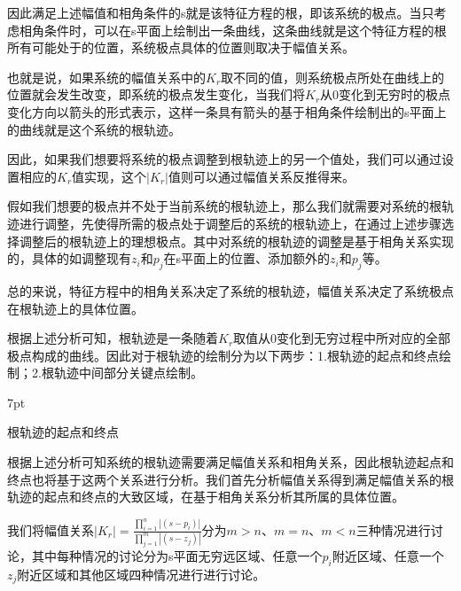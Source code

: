 \documentclass{article}
\numberwithin{equation}{section}
\numberwithin{figure}{section}
\newenvironment{formal}{%
\def\FrameCommand{%
\hspace{1pt}%
{\color{DarkBlue}\vrule width 2pt}%
{\color{formalshade}\vrule width 4pt}%
\colorbox{formalshade}%
}%
\MakeFramed{\advance\hsize-\width\FrameRestore}%
\noindent\hspace{-4.55pt}%
\begin{adjustwidth}{}{7pt}%
\vspace{2pt}\vspace{2pt}%
}
{%
\vspace{2pt}\end{adjustwidth}\endMakeFramed%
}
\begin{document}
因此满足上述幅值和相角条件的s就是该特征方程的根，即该系统的极点。当只考虑相角条件时，可以在s平面上绘制出一条曲线，这条曲线就是这个特征方程的根所有可能处于的位置，系统极点具体的位置则取决于幅值关系。

也就是说，如果系统的幅值关系中的$K_r$取不同的值，则系统极点所处在曲线上的位置就会发生改变，即系统的极点发生变化，当我们将$K_r$从0变化到无穷时的极点变化方向以箭头的形式表示，这样一条具有箭头的基于相角条件绘制出的s平面上的曲线就是这个系统的根轨迹。

因此，如果我们想要将系统的极点调整到根轨迹上的另一个值处，我们可以通过设置相应的$K_r$值实现，这个$|K_r|$值则可以通过幅值关系反推得来。

假如我们想要的极点并不处于当前系统的根轨迹上，那么我们就需要对系统的根轨迹进行调整，先使得所需的极点处于调整后的系统的根轨迹上，在通过上述步骤选择调整后的根轨迹上的理想极点。其中对系统的根轨迹的调整是基于相角关系实现的，具体的如调整现有$z_i$和$p_j$在s平面上的位置、添加额外的$z_i$和$p_j$等。

总的来说，特征方程中的相角关系决定了系统的根轨迹，幅值关系决定了系统极点在根轨迹上的具体位置。

根据上述分析可知，根轨迹是一条随着$K_r$取值从0变化到无穷过程中所对应的全部极点构成的曲线。因此对于根轨迹的绘制分为以下两步：1.根轨迹的起点和终点绘制；2.根轨迹中间部分关键点绘制。

\begin{formal}
    根轨迹的起点和终点
\end{formal}

根据上述分析可知系统的根轨迹需要满足幅值关系和相角关系，因此根轨迹起点和终点也将基于这两个关系进行分析。我们首先分析幅值关系得到满足幅值关系的根轨迹的起点和终点的大致区域，在基于相角关系分析其所属的具体位置。

我们将幅值关系$|K_r|=\frac{\prod_{i=1}^{n}|(s-p_i)|}{\prod_{j=1}^{m}|(s-z_j)|}$分为$m>n$、$m=n$、$m<n$三种情况进行讨论，其中每种情况的讨论分为s平面无穷远区域、任意一个$p_i$附近区域、任意一个$z_j$附近区域和其他区域四种情况进行进行讨论。
\end{document}
